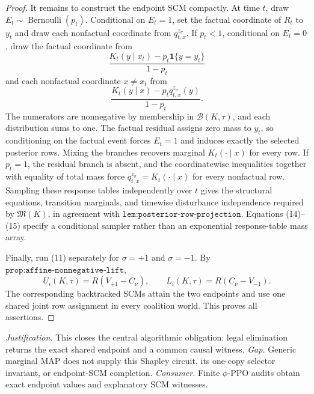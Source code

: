 \documentclass{article}
\begin{document}
\begin{proof}
It remains to construct the endpoint SCM compactly.  At time \(t\), draw \(E_t\sim\operatorname{Bernoulli}(p_t)\).  Conditional on \(E_t=1\), set the factual coordinate of \(R_t\) to \(y_t\) and draw each nonfactual coordinate from \(q^{z_\sigma}_{t,x}\).  If \(p_t<1\), conditional on \(E_t=0\), draw the factual coordinate from
\[
 \frac{K_t(y\mid x_t)-p_t\mathbf 1\{y=y_t\}}{1-p_t}
 \tag{14}
\]
and each nonfactual coordinate \(x\ne x_t\) from
\[
 \frac{K_t(y\mid x)-p_tq^{z_\sigma}_{t,x}(y)}{1-p_t}.
 \tag{15}
\]
The numerators are nonnegative by membership in \(\mathcal B(K,\tau)\), and each distribution sums to one.  The factual residual assigns zero mass to \(y_t\), so conditioning on the factual event forces \(E_t=1\) and induces exactly the selected posterior rows.  Mixing the branches recovers marginal \(K_t(\cdot\mid x)\) for every row.  If \(p_t=1\), the residual branch is absent, and the coordinatewise inequalities together with equality of total mass force \(q^{z_\sigma}_{t,x}=K_t(\cdot\mid x)\) for every nonfactual row.  Sampling these response tables independently over \(t\) gives the structural equations, transition marginals, and timewise disturbance independence required by \(\mathfrak M(K)\), in agreement with \(\texttt{lem:posterior-row-projection}\).  Equations (14)--(15) specify a conditional sampler rather than an exponential response-table mass array.

Finally, run (11) separately for \(\sigma=+1\) and \(\sigma=-1\).  By \(\texttt{prop:affine-nonnegative-lift}\),
\[
 U_i(K,\tau)=R(V_{+1}-C_\nu),
 \qquad
 L_i(K,\tau)=R(C_\nu-V_{-1}).
\]
The corresponding backtracked SCMs attain the two endpoints and use one shared joint row assignment in every coalition world.  This proves all assertions.
\end{proof}
\par\smallskip\noindent \textit{Justification.} This closes the central algorithmic obligation: legal elimination returns the exact shared endpoint and a common causal witness. \textit{Gap.} Generic marginal MAP does not supply this Shapley circuit, its one-copy selector invariant, or endpoint-SCM completion. \textit{Consumer.} Finite \(\phi\)-PPO audits obtain exact endpoint values and explanatory SCM witnesses.
\end{document}
